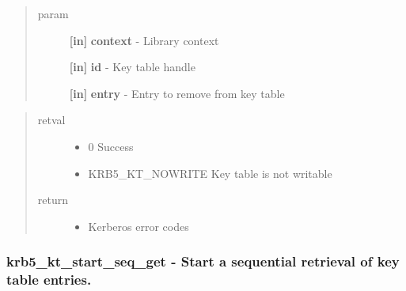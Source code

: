 \documentclass[letterpaper,10pt,english]{sphinxmanual}
\begin{document}
\begin{fulllineitems}
\label{appdev/refs/api/krb5_kt_remove_entry:c.krb5_kt_remove_entry}
\end{fulllineitems}

\begin{quote}\begin{description}
\item[{param}] \leavevmode
\textbf{{[}in{]}} \textbf{context} - Library context

\textbf{{[}in{]}} \textbf{id} - Key table handle

\textbf{{[}in{]}} \textbf{entry} - Entry to remove from key table

\end{description}\end{quote}
\begin{quote}\begin{description}
\item[{retval}] \leavevmode\begin{itemize}
\item {} 
0   Success

\item {} 
KRB5\_KT\_NOWRITE   Key table is not writable

\end{itemize}

\item[{return}] \leavevmode\begin{itemize}
\item {} 
Kerberos error codes

\end{itemize}

\end{description}\end{quote}


\subsubsection{krb5\_kt\_start\_seq\_get -  Start a sequential retrieval of key table entries.}
\label{appdev/refs/api/krb5_kt_start_seq_get:krb5-kt-start-seq-get-start-a-sequential-retrieval-of-key-table-entries}\label{appdev/refs/api/krb5_kt_start_seq_get::doc}
\end{document}
